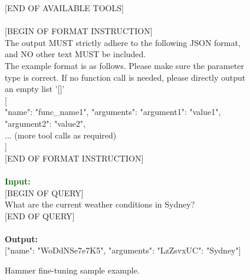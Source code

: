 \begin{figure*}[!ht]
\begin{tcolorbox}[colback=gray!5!white,colframe=black!95!black,title=\textbf{\small{Hammer SFT Sample} | \textbf{Format:} Function Calling}]
{[END OF AVAILABLE TOOLS]} \\
 \\
{[BEGIN OF FORMAT INSTRUCTION]} \\
The output MUST strictly adhere to the following JSON format, and NO other text MUST be included. \\
The example format is as follows. Please make sure the parameter type is correct. If no function call is needed, please directly output an empty list '{[]}' \\
{[ \\
{"name": "func\_name1", "arguments": {"argument1": "value1", "argument2": "value2"}}, \\
... (more tool calls as required) \\
]} \\
{[END OF FORMAT INSTRUCTION]} \\
\\
\small \textcolor{darkgreen}{\textbf{Input:}} \\
{[BEGIN OF QUERY]} \\
What are the current weather conditions in Sydney? \\
{[END OF QUERY]} \\
 \\
\small \textcolor{mypurple}{\textbf{Output:}} \\
{[{"name": "WoDdNSe7e7K5", "arguments": {"LzZsvxUC": "Sydney"}}]}
\end{tcolorbox}

\vspace{-0.25cm}
\caption{Hammer fine-tuning sample example.}
\label{tab:hammer-api-2}
\end{figure*}

